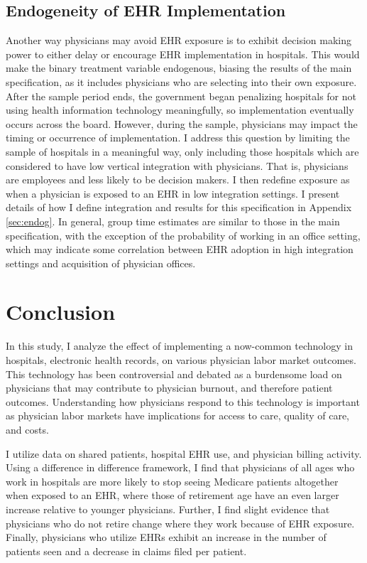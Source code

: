 \documentclass[12pt]{article}
\begin{document}
\subsection{Endogeneity of EHR Implementation}\label{sec:endogeneity}

Another way physicians may avoid EHR exposure is to exhibit decision making power to either delay or encourage EHR implementation in hospitals. This would make the binary treatment variable endogenous, biasing the results of the main specification, as it includes physicians who are selecting into their own exposure. After the sample period ends, the government began penalizing hospitals for not using health information technology meaningfully, so implementation eventually occurs across the board. However, during the sample, physicians may impact the timing or occurrence of implementation. I address this question by limiting the sample of hospitals in a meaningful way, only including those hospitals which are considered to have low vertical integration with physicians. That is, physicians are employees and less likely to be decision makers. I then redefine exposure as when a physician is exposed to an EHR in low integration settings. I present details of how I define integration and results for this specification in Appendix \ref{sec:endog}. In general, group time estimates are similar to those in the main specification, with the exception of the probability of working in an office setting, which may indicate some correlation between EHR adoption in high integration settings and acquisition of physician offices. 


\section{Conclusion}

In this study, I analyze the effect of implementing a now-common technology in hospitals, electronic health records, on various physician labor market outcomes. This technology has been controversial and debated as a burdensome load on physicians that may contribute to physician burnout, and therefore patient outcomes. Understanding how physicians respond to this technology is important as physician labor markets have implications for access to care, quality of care, and costs. 

I utilize data on shared patients, hospital EHR use, and physician billing activity. Using a difference in difference framework, I find that physicians of all ages who work in hospitals are more likely to stop seeing Medicare patients altogether when exposed to an EHR, where those of retirement age have an even larger increase relative to younger physicians. Further, I find slight evidence that physicians who do not retire change where they work because of EHR exposure. Finally, physicians who utilize EHRs exhibit an increase in the number of patients seen and a decrease in claims filed per patient. 
\end{document}
